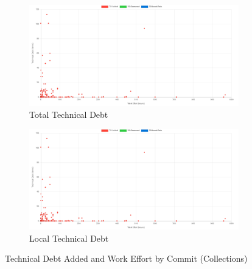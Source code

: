 \documentclass{mpaper}
\begin{document}
\begin{figure}[htp]
	\centering
	\begin{subfigure}{.45\textwidth}
		\includegraphics[width=\linewidth]{images/collections_added_debt_commit.png}
		\caption{Total Technical Debt}
		\label{fig:collections-td-timeline}
	\end{subfigure}
	\begin{subfigure}{.45\textwidth}
		\includegraphics[width=\linewidth]{images/collections_added_debt_commit.png}
		\caption{Local Technical Debt}
		\label{fig:spring-td-timeline}
	\end{subfigure}
	\caption{Technical Debt Added and Work Effort by Commit (Collections)}
	\label{fig:td-timeline}
\end{figure}
\end{document}
